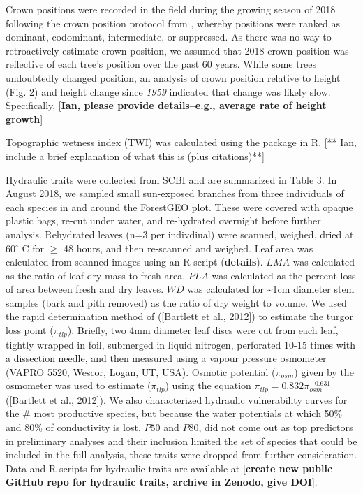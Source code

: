 \documentclass[]{article}
\begin{document}
Crown positions were recorded in the field during the growing season of
2018 following the crown position protocol from
\citep{jennings_assessing_1999}, whereby positions were ranked as
dominant, codominant, intermediate, or suppressed. As there was no way
to retroactively estimate crown position, we assumed that 2018 crown
position was reflective of each tree's position over the past 60 years.
While some trees undoubtedly changed position, an analysis of crown
position relative to height (Fig. 2) and height change since \emph{1959}
indicated that change was likely slow. Specifically, {[}\textbf{Ian,
please provide details--e.g., average rate of height growth}{]}

Topographic wetness index (TWI) was calculated using the
\citep{R-dynatopmodel} package in R. {[}** Ian, include a brief
explanation of what this is (plus citations)**{]}

Hydraulic traits were collected from SCBI and are summarized in Table 3.
In August 2018, we sampled small sun-exposed branches from three
individuals of each species in and around the ForestGEO plot. These were
covered with opaque plastic bags, re-cut under water, and re-hydrated
overnight before further analysis. Rehydrated leaves (n=3 per
indivdiual) were scanned, weighed, dried at 60\(^\circ\) C for \(\ge\)
48 hours, and then re-scanned and weighed. Leaf area was calculated from
scanned images using an R script (\textbf{details}). \(LMA\) was
calculated as the ratio of leaf dry mass to fresh area. \(PLA\) was
calculated as the percent loss of area between fresh and dry leaves.
\(WD\) was calculated for \textasciitilde{}1cm diameter stem samples
(bark and pith removed) as the ratio of dry weight to volume. We used
the rapid determination method of ({[}Bartlett et al., 2012{]}) to
estimate the turgor loss point (\(\pi_{tlp}\)). Briefly, two 4mm
diameter leaf discs were cut from each leaf, tightly wrapped in foil,
submerged in liquid nitrogen, perforated 10-15 times with a dissection
needle, and then measured using a vapour pressure osmometer (VAPRO 5520,
Wescor, Logan, UT, USA). Osmotic potential (\(\pi_{osm}\)) given by the
osmometer was used to estimate (\(\pi_{tlp}\)) using the equation
\(\pi_{tlp}=0.832 \pi_{osm} ^{-0.631}\) ({[}Bartlett et al., 2012{]}).
We also characterized hydraulic vulnerability curves for the \# most
productive species, but because the water potentials at which 50\% and
80\% of conductivity is lost, \(P50\) and \(P80\), did not come out as
top predictors in preliminary analyses and their inclusion limited the
set of species that could be included in the full analysis, these traits
were dropped from further consideration. Data and R scripts for
hydraulic traits are available at {[}\textbf{create new public GitHub
repo for hydraulic traits, archive in Zenodo, give DOI}{]}.
\end{document}
